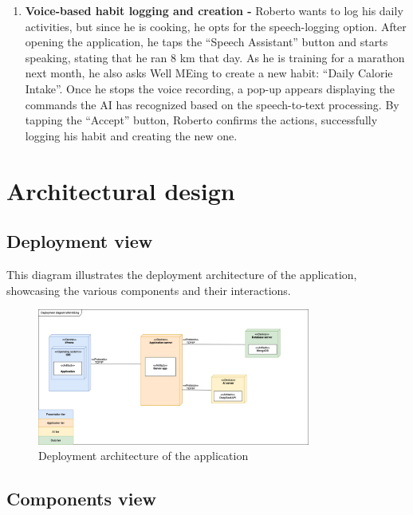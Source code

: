 \documentclass{article}
\begin{document}
\begin{enumerate}[label=\textbf{S\arabic* -}]
    \item \textbf{Voice-based habit logging and creation -}
        Roberto wants to log his daily activities, but since he is cooking, he opts for the speech-logging option.
        After opening the application, he taps the “Speech Assistant” button and starts speaking, stating that he ran 8 km that day.
        As he is training for a marathon next month, he also asks Well MEing to create a new habit: “Daily Calorie Intake”.
        Once he stops the voice recording, a pop-up appears displaying the commands the AI has recognized based on the speech-to-text processing.
        By tapping the “Accept” button, Roberto confirms the actions, successfully logging his habit and creating the new one.

\end{enumerate}

\section{Architectural design}

\subsection{Deployment view}

This diagram illustrates the deployment architecture of the application, showcasing the various components and their interactions.

\begin{figure}[H]
    \centering
    \includegraphics[width=0.8\textwidth]{images/DeploymentView.png}
    \caption{Deployment architecture of the application}
    \label{fig:deployment_diagram}
\end{figure}

\subsection{Components view}
\end{document}
